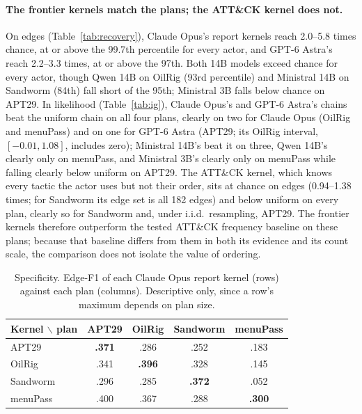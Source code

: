 \documentclass[letterpaper]{article} %
\begin{document}
\paragraph{The frontier kernels match the plans; the ATT\&CK kernel does not.} On edges (Table~\ref{tab:recovery}), Claude Opus's report kernels reach 2.0--5.8 times chance, at or above the 99.7th percentile for every actor, and GPT-6 Astra's reach 2.2--3.3 times, at or above the 97th. Both 14B models exceed chance for every actor, though Qwen 14B on OilRig (93rd percentile) and Ministral 14B on Sandworm (84th) fall short of the 95th; Ministral 3B falls below chance on APT29. In likelihood (Table~\ref{tab:ig}), Claude Opus's and GPT-6 Astra's chains beat the uniform chain on all four plans, clearly on two for Claude Opus (OilRig and menuPass) and on one for GPT-6 Astra (APT29; its OilRig interval, $[-0.01, 1.08]$, includes zero); Ministral 14B's beat it on three, Qwen 14B's clearly only on menuPass, and Ministral 3B's clearly only on menuPass while falling clearly below uniform on APT29. The ATT\&CK kernel, which knows every tactic the actor uses but not their order, sits at chance on edges (0.94--1.38 times; for Sandworm its edge set is all 182 edges) and below uniform on every plan, clearly so for Sandworm and, under i.i.d.\ resampling, APT29. The frontier kernels therefore outperform the tested ATT\&CK frequency baseline on these plans; because that baseline differs from them in both its evidence and its count scale, the comparison does not isolate the value of ordering.

\begin{table}[t]
\centering
\small
\begin{tabular}{@{}lcccc@{}}
\toprule
Kernel $\backslash$ plan & APT29 & OilRig & Sandworm & menuPass \\
\midrule
APT29 & \textbf{.371} & .286 & .252 & .183 \\
OilRig & .341 & \textbf{.396} & .328 & .145 \\
Sandworm & .296 & .285 & \textbf{.372} & .052 \\
menuPass & .400 & .367 & .288 & \textbf{.300} \\
\bottomrule
\end{tabular}
\caption{Specificity. Edge-F1 of each Claude Opus report kernel (rows) against each plan (columns). Descriptive only, since a row's maximum depends on plan size.}
\label{tab:h4}
\end{table}
\end{document}

